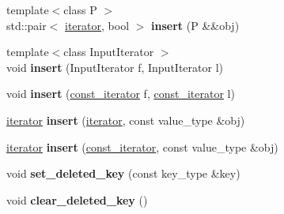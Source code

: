 \begin{DoxyCompactItemize}
\item 
{\footnotesize template$<$class P $>$ }\\std\+::pair$<$ \hyperlink{classspp___1_1_two__d__iterator}{iterator}, bool $>$ {\bfseries insert} (P \&\&obj)\hypertarget{classspp___1_1sparse__hash__map_a6bafbcc91dd9f9c2147d3961a7d258bd}{}\label{classspp___1_1sparse__hash__map_a6bafbcc91dd9f9c2147d3961a7d258bd}

\item 
{\footnotesize template$<$class Input\+Iterator $>$ }\\void {\bfseries insert} (Input\+Iterator f, Input\+Iterator l)\hypertarget{classspp___1_1sparse__hash__map_ac63cc00c78deaaecb15a37bca98ae52e}{}\label{classspp___1_1sparse__hash__map_ac63cc00c78deaaecb15a37bca98ae52e}

\item 
void {\bfseries insert} (\hyperlink{classspp___1_1_two__d__iterator}{const\+\_\+iterator} f, \hyperlink{classspp___1_1_two__d__iterator}{const\+\_\+iterator} l)\hypertarget{classspp___1_1sparse__hash__map_a1062158781a6b76262903fbcb6736491}{}\label{classspp___1_1sparse__hash__map_a1062158781a6b76262903fbcb6736491}

\item 
\hyperlink{classspp___1_1_two__d__iterator}{iterator} {\bfseries insert} (\hyperlink{classspp___1_1_two__d__iterator}{iterator}, const value\+\_\+type \&obj)\hypertarget{classspp___1_1sparse__hash__map_aea7e2fe2a1dbc62f550344fec44e6144}{}\label{classspp___1_1sparse__hash__map_aea7e2fe2a1dbc62f550344fec44e6144}

\item 
\hyperlink{classspp___1_1_two__d__iterator}{iterator} {\bfseries insert} (\hyperlink{classspp___1_1_two__d__iterator}{const\+\_\+iterator}, const value\+\_\+type \&obj)\hypertarget{classspp___1_1sparse__hash__map_a430dd7e0ffd29a8797595643f798cf7c}{}\label{classspp___1_1sparse__hash__map_a430dd7e0ffd29a8797595643f798cf7c}

\item 
void {\bfseries set\+\_\+deleted\+\_\+key} (const key\+\_\+type \&key)\hypertarget{classspp___1_1sparse__hash__map_afe782df24c279a2a314889082316369d}{}\label{classspp___1_1sparse__hash__map_afe782df24c279a2a314889082316369d}

\item 
void {\bfseries clear\+\_\+deleted\+\_\+key} ()\hypertarget{classspp___1_1sparse__hash__map_aa120a968ff73a8aa22d890a8140f13ac}{}\label{classspp___1_1sparse__hash__map_aa120a968ff73a8aa22d890a8140f13ac}


\end{DoxyCompactItemize}
